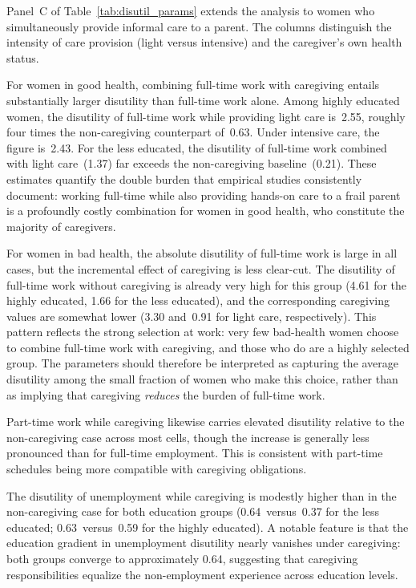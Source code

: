Panel~C of Table~\ref{tab:disutil_params} extends the analysis to women
who simultaneously provide informal care to a parent.  The columns
distinguish the intensity of care provision (light versus intensive) and
the caregiver's own health status.

For women in good health, combining full-time work with caregiving entails
substantially larger disutility than full-time work alone.  Among highly
educated women, the disutility of full-time work while providing light
care is~2.55, roughly four times the non-caregiving counterpart of~0.63.
Under intensive care, the figure is~2.43.  For the less educated, the
disutility of full-time work combined with light care~(1.37) far exceeds
the non-caregiving baseline~(0.21).  These estimates quantify the double
burden that empirical studies consistently document: working full-time
while also providing hands-on care to a frail parent is a profoundly
costly combination for women in good health, who constitute the majority
of caregivers.

For women in bad health, the absolute disutility of full-time work is
large in all cases, but the incremental effect of caregiving is less
clear-cut.  The disutility of full-time work without caregiving is already
very high for this group (4.61 for the highly educated, 1.66 for the less
educated), and the corresponding caregiving values are somewhat lower
(3.30 and~0.91 for light care, respectively).  This pattern reflects the
strong selection at work: very few bad-health women choose to combine
full-time work with caregiving, and those who do are a highly selected
group.  The parameters should therefore be interpreted as capturing the
average disutility among the small fraction of women who make this choice,
rather than as implying that caregiving \emph{reduces} the burden of
full-time work.

Part-time work while caregiving likewise carries elevated disutility
relative to the non-caregiving case across most cells, though the
increase is generally less pronounced than for full-time employment.
This is consistent with part-time schedules being more compatible with
caregiving obligations.

The disutility of unemployment while caregiving is modestly higher than
in the non-caregiving case for both education groups (0.64~versus~0.37
for the less educated; 0.63~versus~0.59 for the highly educated).  A
notable feature is that the education gradient in unemployment disutility
nearly vanishes under caregiving: both groups converge to approximately
0.64, suggesting that caregiving responsibilities equalize the
non-employment experience across education levels.


